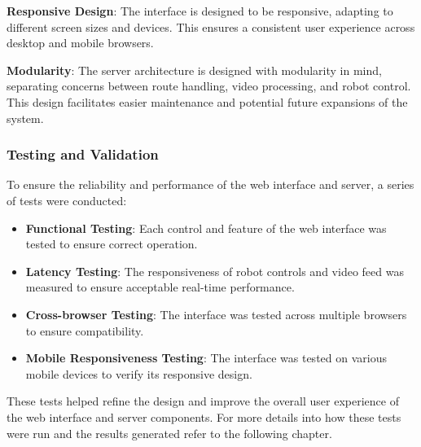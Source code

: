 \textbf{Responsive Design}: The interface is designed to be responsive, adapting to different screen sizes and devices. This ensures a consistent user experience across desktop and mobile browsers.

\textbf{Modularity}: The server architecture is designed with modularity in mind, separating concerns between route handling, video processing, and robot control. This design facilitates easier maintenance and potential future expansions of the system.

\subsubsection{Testing and Validation}
To ensure the reliability and performance of the web interface and server, a series of tests were conducted:

\begin{itemize}
	\item \textbf{Functional Testing}: Each control and feature of the web interface was tested to ensure correct operation.
	\item \textbf{Latency Testing}: The responsiveness of robot controls and video feed was measured to ensure acceptable real-time performance.
	\item \textbf{Cross-browser Testing}: The interface was tested across multiple browsers to ensure compatibility.
	\item \textbf{Mobile Responsiveness Testing}: The interface was tested on various mobile devices to verify its responsive design.
\end{itemize}

These tests helped refine the design and improve the overall user experience of the web interface and server components. For more details into how these tests were run and the results generated refer to the following chapter.